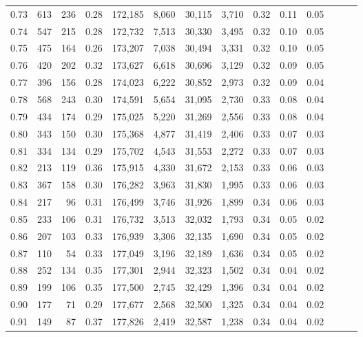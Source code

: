 \begin{tabular}{rrrrrrrrrrrrrr}
0.73 &    613 &  236 &  0.28 &  172,185 &    8,060 &  30,115 &   3,710 &  0.32 &  0.11 &      0.05 \\
0.74 &    547 &  215 &  0.28 &  172,732 &    7,513 &  30,330 &   3,495 &  0.32 &  0.10 &      0.05 \\
0.75 &    475 &  164 &  0.26 &  173,207 &    7,038 &  30,494 &   3,331 &  0.32 &  0.10 &      0.05 \\
0.76 &    420 &  202 &  0.32 &  173,627 &    6,618 &  30,696 &   3,129 &  0.32 &  0.09 &      0.05 \\
0.77 &    396 &  156 &  0.28 &  174,023 &    6,222 &  30,852 &   2,973 &  0.32 &  0.09 &      0.04 \\
0.78 &    568 &  243 &  0.30 &  174,591 &    5,654 &  31,095 &   2,730 &  0.33 &  0.08 &      0.04 \\
0.79 &    434 &  174 &  0.29 &  175,025 &    5,220 &  31,269 &   2,556 &  0.33 &  0.08 &      0.04 \\
0.80 &    343 &  150 &  0.30 &  175,368 &    4,877 &  31,419 &   2,406 &  0.33 &  0.07 &      0.03 \\
0.81 &    334 &  134 &  0.29 &  175,702 &    4,543 &  31,553 &   2,272 &  0.33 &  0.07 &      0.03 \\
0.82 &    213 &  119 &  0.36 &  175,915 &    4,330 &  31,672 &   2,153 &  0.33 &  0.06 &      0.03 \\
0.83 &    367 &  158 &  0.30 &  176,282 &    3,963 &  31,830 &   1,995 &  0.33 &  0.06 &      0.03 \\
0.84 &    217 &   96 &  0.31 &  176,499 &    3,746 &  31,926 &   1,899 &  0.34 &  0.06 &      0.03 \\
0.85 &    233 &  106 &  0.31 &  176,732 &    3,513 &  32,032 &   1,793 &  0.34 &  0.05 &      0.02 \\
0.86 &    207 &  103 &  0.33 &  176,939 &    3,306 &  32,135 &   1,690 &  0.34 &  0.05 &      0.02 \\
0.87 &    110 &   54 &  0.33 &  177,049 &    3,196 &  32,189 &   1,636 &  0.34 &  0.05 &      0.02 \\
0.88 &    252 &  134 &  0.35 &  177,301 &    2,944 &  32,323 &   1,502 &  0.34 &  0.04 &      0.02 \\
0.89 &    199 &  106 &  0.35 &  177,500 &    2,745 &  32,429 &   1,396 &  0.34 &  0.04 &      0.02 \\
0.90 &    177 &   71 &  0.29 &  177,677 &    2,568 &  32,500 &   1,325 &  0.34 &  0.04 &      0.02 \\
0.91 &    149 &   87 &  0.37 &  177,826 &    2,419 &  32,587 &   1,238 &  0.34 &  0.04 &      0.02 \\

\end{tabular}

